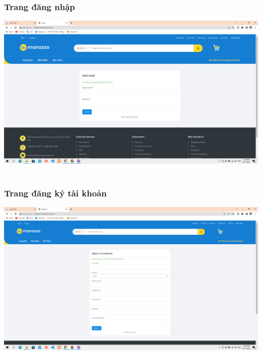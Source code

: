 \documentclass[12pt,a4paper,2sides]{report}
\begin{document}
\subsubsection{Trang đăng nhập}
    \includegraphics[width=1\linewidth]{lib/results/login.jpg}\\\vspace*{1cm} 
    \hspace{5cm}{Hình 39. Trang đăng nhập}\\
\subsubsection{Trang đăng ký tài khoản}
    \includegraphics[width=1\linewidth]{lib/results/dangkytk.jpg}\\\vspace*{1cm}
    \hspace{5cm}{Hình 40. Trang đăng ký tài khoản}\\
\end{document}
